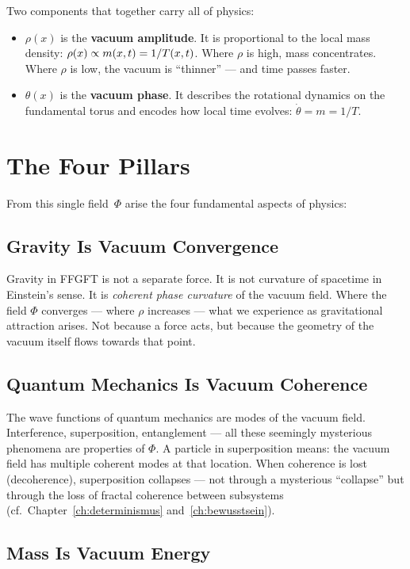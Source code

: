 Two components that together carry all of physics:
\begin{itemize}
\item $\rho(x)$ is the \textbf{vacuum amplitude}. It is proportional to the local mass density: $\rho(x) \propto m(x,t) = 1/T(x,t)$. Where $\rho$ is high, mass concentrates. Where $\rho$ is low, the vacuum is ``thinner'' --- and time passes faster.
\item $\theta(x)$ is the \textbf{vacuum phase}. It describes the rotational dynamics on the fundamental torus and encodes how local time evolves: $\dot{\theta} = m = 1/T$.
\end{itemize}

\section{The Four Pillars}

From this single field~$\Phi$ arise the four fundamental aspects of physics:

\subsection{Gravity Is Vacuum Convergence}

Gravity in FFGFT is not a separate force. It is not curvature of spacetime in Einstein's sense. It is \emph{coherent phase curvature} of the vacuum field. Where the field $\Phi$ converges --- where $\rho$ increases --- what we experience as gravitational attraction arises. Not because a force acts, but because the geometry of the vacuum itself flows towards that point.

\subsection{Quantum Mechanics Is Vacuum Coherence}

The wave functions of quantum mechanics are modes of the vacuum field. Interference, superposition, entanglement --- all these seemingly mysterious phenomena are properties of $\Phi$. A particle in superposition means: the vacuum field has multiple coherent modes at that location. When coherence is lost (decoherence), superposition collapses --- not through a mysterious ``collapse'' but through the loss of fractal coherence between subsystems (cf.\ Chapter~\ref{ch:determinismus} and~\ref{ch:bewusstsein}).

\subsection{Mass Is Vacuum Energy}

